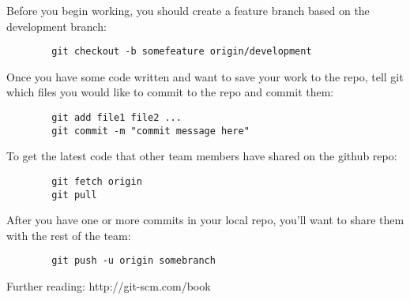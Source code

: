 \documentclass{article}
\begin{document}
	Before you begin working, you should create a feature branch based on the development branch:

	\begin{minipage}{0.95\textwidth}\begin{lstlisting}
	    git checkout -b somefeature origin/development
	\end{lstlisting}\end{minipage}

	Once you have some code written and want to save your work to the repo, tell git which files you would like to commit to the repo and commit them:
	
	\begin{minipage}{0.95\textwidth}\begin{lstlisting}
	    git add file1 file2 ...
	    git commit -m "commit message here"
	\end{lstlisting}\end{minipage}

	To get the latest code that other team members have shared on the github repo:

	\begin{minipage}{0.95\textwidth}\begin{lstlisting}
	    git fetch origin
	    git pull
	\end{lstlisting}\end{minipage}

	After you have one or more commits in your local repo, you'll want to share them with the rest of the team:

	\begin{minipage}{0.95\textwidth}\begin{lstlisting}
	    git push -u origin somebranch
	\end{lstlisting}\end{minipage}

	Further reading: http://git-scm.com/book
\end{document}
